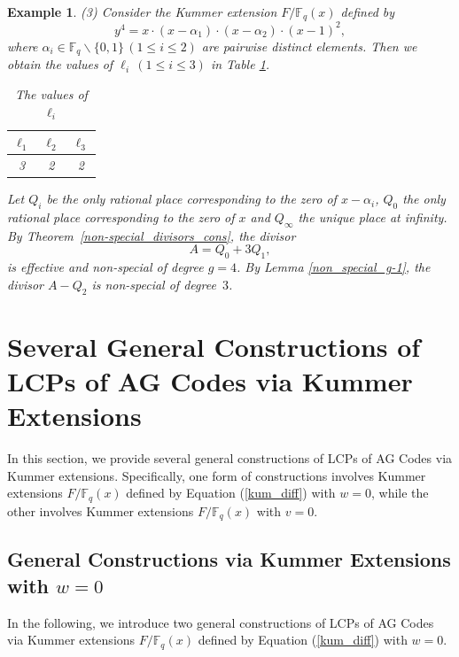 \documentclass[journal,12pt,onecolumn]{IEEEtran}
\newtheorem{example}[theorem]{Example}
\begin{document}
\begin{example}
    {\rm (3)} Consider the Kummer extension $F/\mathbb{F}_q(x)$ defined by 
    \[
        y^4 = x \cdot(x-\alpha_1)\cdot(x - \alpha_2)\cdot(x-1)^2,  
    \]
    where $\alpha_i\in\mathbb{F}_q\backslash\{0,1\} \,(1\le i\le 2)$ are pairwise distinct elements. Then we obtain the values of $\ell_i\,(1\le i\le 3)$ in Table \ref{tab:ell_i_non-special_divisors_cons_ex_3}.
    \begin{table}[ht]
	\centering
	\begin{tabular}{ccc}
		\hline
        $\ell_1$ & $\ell_2$ & $\ell_3$   \\
        \hline
		3      & 2      & 2       \\
        \hline
	\end{tabular}
	\caption{The values of $\ell_i$}
	\label{tab:ell_i_non-special_divisors_cons_ex_3}
    \end{table}
    Let $Q_i$ be the only rational place corresponding to the zero of $x-\alpha_i$, $Q_0$ the only rational place corresponding to the zero of $x$ and $Q_\infty$ the unique place at infinity. By Theorem~\ref{non-special_divisors_cons}, the divisor
    \[
        A = Q_0 + 3Q_1,
    \]
    is effective and non-special of degree $g=4$. By Lemma \ref{non_special_g-1}, the divisor $A-Q_2$ is non-special of degree~$3$. 
\end{example}





\section{Several General Constructions of LCPs of AG Codes via Kummer Extensions}\label{gen_con_LCP}

In this section, we provide several general constructions of LCPs of AG Codes via Kummer extensions. Specifically, one form of constructions involves Kummer extensions $F/\mathbb{F}_q(x)$ defined by Equation (\ref{kum_diff}) with $w=0$, while the other involves Kummer extensions $F/\mathbb{F}_q(x)$ with $v=0$.

\subsection{General Constructions via Kummer Extensions with $w=0$}

In the following, we introduce two general constructions of LCPs of AG Codes via Kummer extensions $F/\mathbb{F}_q(x)$ defined by Equation (\ref{kum_diff}) with $w=0$.
\end{document}
